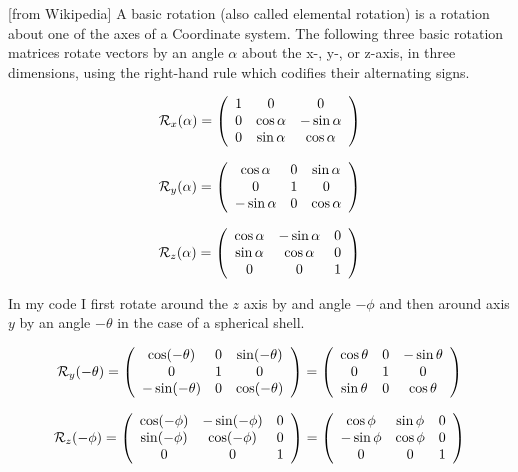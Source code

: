 [from Wikipedia] A basic rotation (also called elemental rotation) is a rotation about one of the axes of a Coordinate system. 
The following three basic rotation matrices rotate vectors by an angle $\alpha$ 
about the x-, y-, or z-axis, in three dimensions, using the right-hand rule which codifies their 
alternating signs. 

\[
{\cal R}_x(\alpha)=
\left(
\begin{array}{ccc}
1 & 0 & 0 \\
0 & \cos\alpha & -\sin\alpha \\
0 & \sin\alpha & \cos\alpha
\end{array}
\right)
\]

\[
{\cal R}_y(\alpha)=
\left(
\begin{array}{ccc}
\cos\alpha & 0 & \sin\alpha \\
0 & 1 & 0 \\
-\sin\alpha & 0 &\cos\alpha
\end{array}
\right)
\]

\[
{\cal R}_z(\alpha)=
\left(
\begin{array}{ccc}
\cos\alpha & -\sin\alpha & 0\\
\sin\alpha & \cos\alpha & 0 \\
0 & 0 & 1 
\end{array}
\right)
\]

In my \elefant code
I first rotate around the $z$ axis by and angle $-\phi$ and then 
around axis $y$ by an angle $-\theta$ in the case of a spherical shell.

\[
{\cal R}_y(-\theta)=
\left(
\begin{array}{ccc}
\cos(-\theta) & 0 & \sin(-\theta) \\
0 & 1 & 0 \\
-\sin(-\theta) & 0 &\cos(-\theta)
\end{array}
\right)
=
\left(
\begin{array}{ccc}
\cos\theta & 0 & -\sin\theta \\
0 & 1 & 0 \\
\sin\theta & 0 &\cos\theta
\end{array}
\right)
\]

\[
{\cal R}_z(-\phi)
=
\left(
\begin{array}{ccc}
\cos(-\phi)& -\sin(-\phi) & 0\\
\sin(-\phi)& \cos(-\phi) & 0 \\
0 & 0 & 1 
\end{array}
\right)
=
\left(
\begin{array}{ccc}
\cos\phi& \sin\phi & 0\\
-\sin\phi& \cos\phi & 0 \\
0 & 0 & 1 
\end{array}
\right)
\]

